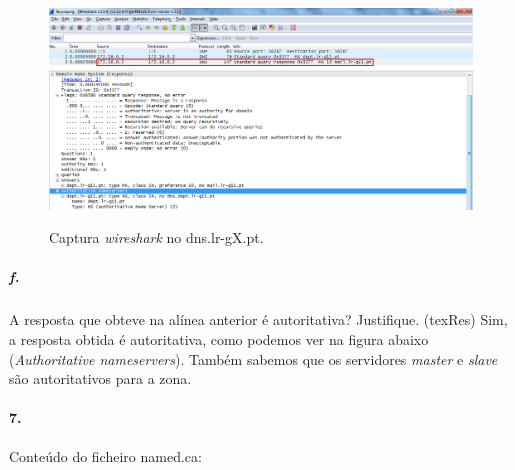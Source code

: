 \begin{figure}[h]
\centering
\includegraphics[width=1\textwidth, height=0.35\textheight]{6e_cap.png}
\label{fig:2-capturaWireshark}
\caption{Captura \emph{wireshark} no \textsf{dns.lr-gX.pt}.}
\end{figure}


\subparagraph{f.}
A resposta que obteve na alínea anterior é autoritativa? Justifique. (texRes)
Sim, a resposta obtida é autoritativa, como podemos ver na figura abaixo (\emph{Authoritative nameservers}).
Também sabemos que os servidores \emph{master} e \emph{slave} são autoritativos para a zona.


\paragraph{7.}

Conteúdo do ficheiro \textsf{named.ca}:

